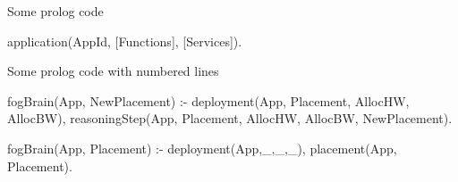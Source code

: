 \documentclass{article}
\author{}
\title{}
\begin{document}
Some prolog code

\begin{code} 
application(AppId, [Functions], [Services]).
\end{code}

Some prolog code with numbered lines

\begin{codeNum}[firstnumber=1, breaklines]
fogBrain(App, NewPlacement) :-
deployment(App, Placement, AllocHW, AllocBW),
reasoningStep(App, Placement, AllocHW, AllocBW, NewPlacement).

fogBrain(App, Placement) :-
\+deployment(App,_,_,_),
placement(App, Placement).
\end{codeNum}
\end{document}
